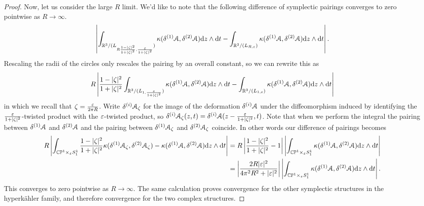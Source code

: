 \documentclass[10pt, oneside]{article}
\renewcommand{\d}{\mathrm{d}}
\begin{document}
\begin{proof}
Now, let us consider the large $R$ limit.  We'd like to note that the following difference of symplectic pairings converges to zero pointwise as $R\to \infty$.
\[ \left\lvert \int_{\RR^3/(L_{R \frac {1-|\zeta|^2}{1+|\zeta|^2},\frac{\eps}{1+|\zeta|^2}})} \kappa(\delta^{(1)} \mc A, \delta^{(2)} \mc A) \d z  \wedge \d t - \int_{\RR^3/(L_{R,\eps})} \kappa(\delta^{(1)} \mc A, \delta^{(2)} \mc A) \d z  \wedge \d t \right \rvert.\]
Rescaling the radii of the circles only rescales the pairing by an overall constant, so we can rewrite this as 
\[ R\left\lvert \frac {1-|\zeta|^2}{1+|\zeta|^2} \int_{\RR^3/(L_{1,\frac{\eps}{1+|\zeta|^2}})} \kappa(\delta^{(1)} \mc A, \delta^{(2)} \mc A) \d z  \wedge \d t - \int_{\RR^3/(L_{1,\eps})} \kappa(\delta^{(1)} \mc A, \delta^{(2)} \mc A) \d z  \wedge \d t \right \rvert\]
in which we recall that $\zeta = \frac {\varepsilon} {2\pi R}$.  Write $\delta^{(i)}\mathcal{A}_\zeta$ for the image of the deformation $\delta^{(i)}\mathcal{A}$ under the diffeomorphism induced by identifying the $\frac{\varepsilon}{1+|\zeta|^2}$-twisted product with the $\varepsilon$-twisted product, so $\delta^{(i)}\mathcal{A}_\zeta(z,t) = \delta^{(i)}\mathcal{A}(z-\frac{\varepsilon}{1+|\zeta|^2},t)$.  Note that when we perform the integral the pairing between $\delta^{(1)}\mathcal{A}$ and $\delta^{(2)}\mathcal{A}$ and the pairing between $\delta^{(1)}\mathcal{A}_\zeta$ and $\delta^{(2)}\mathcal{A}_\zeta$ coincide.  In other words our difference of pairings becomes
\begin{align*} 
R\left\lvert \int_{\bb{CP}^1 \times_\eps S^1_1} \frac {1-|\zeta|^2}{1+|\zeta|^2} \kappa(\delta^{(1)} \mc A_\zeta, \delta^{(2)} \mc A_\zeta)  -  \kappa(\delta^{(1)} \mc A, \delta^{(2)} \mc A) \d z  \wedge \d t \right \rvert &= R \left\lvert \frac {1-|\zeta|^2}{1+|\zeta|^2} - 1 \right\rvert \left\lvert \int_{\bb{CP}^1 \times_\eps S^1_1} \kappa(\delta^{(1)} \mc A, \delta^{(2)} \mc A) \d z  \wedge \d t \right \rvert \\
&= \left\lvert\frac {2R |\eps|^2}{4 \pi^2 R^2 + |\eps|^2} \right \rvert \left\lvert \int_{\bb{CP}^1 \times_\eps S^1_1} \kappa(\delta^{(1)} \mc A, \delta^{(2)} \mc A) \d z  \wedge \d t \right \rvert.
\end{align*}
This converges to zero pointwise as $R \to \infty$.  The same calculation proves convergence for the other symplectic structures in the hyperk\"ahler family, and therefore convergence for the two complex structures.
\end{proof}

\begin{remark}
\end{remark}
\end{document}
